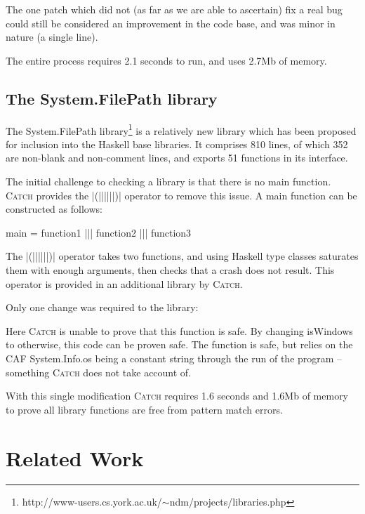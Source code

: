 \documentclass[preprint]{sigplanconf}
\newcommand{\C}[1]{\textsf{#1}}
\newcommand{\catch}{\textsc{Catch}}
\begin{document}
The one patch which did not (as far as we are able to ascertain) fix a real bug could still be considered an improvement in the code base, and was minor in nature (a single line).

The entire process requires 2.1 seconds to run, and uses 2.7Mb of memory.

\subsection{The System.FilePath library}
\label{sec:filepath}

The System.FilePath library\footnote{http://www-users.cs.york.ac.uk/$\sim$ndm/projects/libraries.php} is a relatively new library which has been proposed for inclusion into the Haskell base libraries. It comprises 810 lines, of which 352 are non-blank and non-comment lines, and exports 51 functions in its interface.

The initial challenge to checking a library is that there is no \C{main} function. \catch{} provides the |(||||||)| operator to remove this issue. A \C{main} function can be constructed as follows:

\begin{code}
main = function1 ||| function2 ||| function3
\end{code}

The |(||||||)| operator takes two functions, and using Haskell type classes saturates them with enough arguments, then checks that a crash does not result. This operator is provided in an additional library by \catch{}.

Only one change was required to the library:


Here \catch{} is unable to prove that this function is safe. By changing \C{isWindows} to \C{otherwise}, this code can be proven safe. The function is safe, but relies on the CAF \C{System.Info.os} being a constant string through the run of the program -- something \catch{} does not take account of.

With this single modification \catch{} requires 1.6 seconds and 1.6Mb of memory to prove all library functions are free from pattern match errors.

\section{Related Work}
\label{sec:related}
\end{document}
